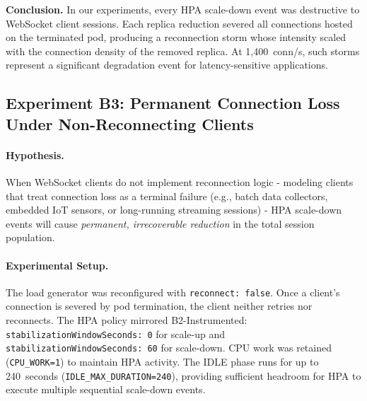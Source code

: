 \documentclass[twocolumn]{svjour3}
\begin{document}
\begin{keyresult}
\noindent\textbf{Conclusion.} In our experiments, every HPA scale-down event was destructive
to WebSocket client sessions. Each replica reduction severed all connections hosted on the
terminated pod, producing a reconnection storm whose intensity scaled with the connection
density of the removed replica. At 1,400~conn/s, such storms represent a significant
degradation event for latency-sensitive applications.
\end{keyresult}

\subsection{Experiment B3: Permanent Connection Loss Under Non-Reconnecting Clients}
\label{sec:b3}

\paragraph{Hypothesis.} When WebSocket clients do not implement reconnection logic -
modeling clients that treat connection loss as a terminal failure (e.g., batch data
collectors, embedded IoT sensors, or long-running streaming sessions) - HPA scale-down
events will cause \textit{permanent, irrecoverable reduction} in the total session population.

\paragraph{Experimental Setup.} The load generator was reconfigured with
\texttt{reconnect: false}. Once a client's connection is severed by pod termination, the
client neither retries nor reconnects. The HPA policy mirrored B2-Instrumented:
\texttt{stabilizationWindowSeconds: 0} for scale-up and \texttt{stabilizationWindowSeconds:
60} for scale-down. CPU work was retained (\texttt{CPU\_WORK=1}) to maintain HPA activity.
The IDLE phase runs for up to 240~seconds (\texttt{IDLE\_MAX\_DURATION=240}), providing
sufficient headroom for HPA to execute multiple sequential scale-down events.
\end{document}
